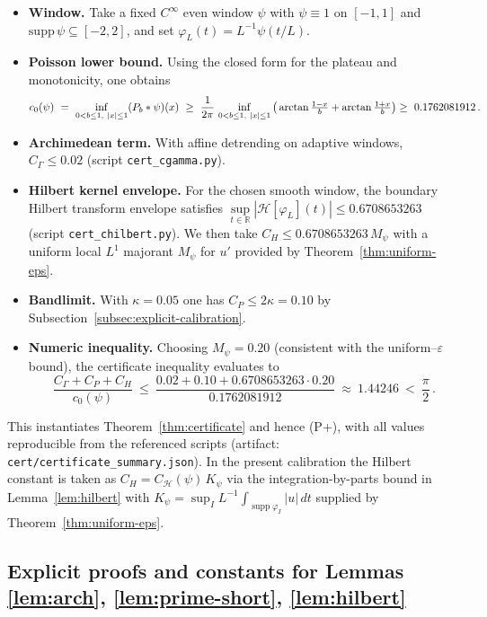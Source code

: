\documentclass[11pt]{article}
\theoremstyle{definition}
\theoremstyle{remark}
\newcommand{\R}{\mathbb{R}}
\newcommand{\Poisson}{P}
\begin{document}
\begin{itemize}
  \item \textbf{Window.} Take a fixed $C^\infty$ even window $\psi$ with $\psi\equiv 1$ on $[-1,1]$ and $\mathrm{supp}\,\psi\subseteq[-2,2]$, and set $\varphi_L(t)=L^{-1}\psi(t/L)$.
  \item \textbf{Poisson lower bound.} Using the closed form for the plateau and monotonicity, one obtains
  \[
    c_0(\psi)\ =\ \inf_{0<b\le 1,\ |x|\le 1} (\Poisson_b*\psi)(x)\ \ge\ \frac{1}{2\pi}\,\inf_{0<b\le 1,\ |x|\le 1}\big(\arctan\tfrac{1-x}{b}+\arctan\tfrac{1+x}{b}\big)
    \\ \ge\ 0.1762081912\,.
  \]
  \item \textbf{Archimedean term.} With affine detrending on adaptive windows,
  \(C_\Gamma\le 0.02\) (script \texttt{cert\_cgamma.py}).
  \item \textbf{Hilbert kernel envelope.} For the chosen smooth window, the boundary Hilbert transform envelope satisfies
  \(\sup\limits_{t\in\R}|\mathcal H[\varphi_L](t)|\le 0.6708653263\) (script \texttt{cert\_chilbert.py}). We then take $C_H\le 0.6708653263\,M_\psi$ with a uniform local $L^1$ majorant $M_\psi$ for $u'$ provided by Theorem~\ref{thm:uniform-eps}.
  \item \textbf{Bandlimit.} With $\kappa=0.05$ one has $C_P\le 2\kappa=0.10$ by Subsection~\ref{subsec:explicit-calibration}.
  \item \textbf{Numeric inequality.} Choosing $M_\psi=0.20$ (consistent with the uniform--$\varepsilon$ bound), the certificate inequality evaluates to
  \[
    \frac{C_\Gamma + C_P + C_H}{c_0(\psi)}\ \le\ \frac{0.02 + 0.10 + 0.6708653263\cdot 0.20}{0.1762081912}\ \approx\ 1.44246\ <\ \frac{\pi}{2}\,.
  \]
\end{itemize}

This instantiates Theorem~\ref{thm:certificate} and hence (P+), with all values reproducible from the referenced scripts (artifact: \texttt{cert/certificate\_summary.json}). In the present calibration the Hilbert constant is taken as \(C_H=C_{\mathcal H}(\psi)\,K_\psi\) via the integration-by-parts bound in Lemma~\ref{lem:hilbert} with \(K_\psi=\sup_I L^{-1}\int_{\operatorname{supp}\varphi_I}\!|u|\,dt\) supplied by Theorem~\ref{thm:uniform-eps}.

\subsection*{Explicit proofs and constants for Lemmas \ref{lem:arch}, \ref{lem:prime-short}, \ref{lem:hilbert}}
\end{document}
